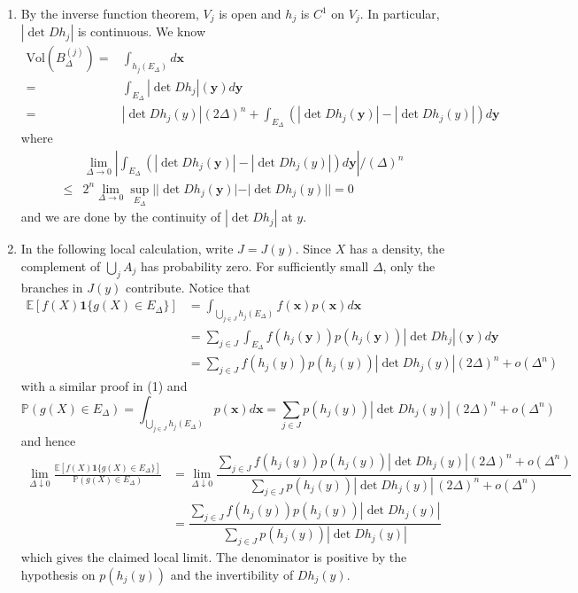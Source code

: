 \documentclass[lang=en,11pt,a4paper,citestyle=authoryear]{elegantpaper}
\newcommand{\E}{\mathbb{E}}
\renewcommand{\P}{\mathbb{P}}
\begin{document}
\begin{enumerate}[label=(\arabic*),leftmargin=*]
\item By the inverse function theorem, $V_j$ is open and $h_j$ is $C^1$ on $V_j$. In particular, $|\det Dh_j|$ is continuous. We know\[\begin{aligned}
\text{Vol}(B_{\Delta}^{(j)}) =& \int_{h_j(E_{\Delta})} d\mathbf{x} \\=& \int_{E_{\Delta}}|\det Dh_j|(\mathbf{y})d\mathbf{y} \\=& |\det Dh_j(y)|(2\Delta)^n + \int_{E_{\Delta}}\left(|\det Dh_j(\mathbf{y})| - |\det Dh_j(y)|\right)d\mathbf{y}
\end{aligned}
\]
where
\[
\begin{aligned}
&\lim\limits_{\Delta\to 0}\left|\int_{E_{\Delta}}\left(|\det Dh_j(\mathbf{y})| - |\det Dh_j(y)|\right)d\mathbf{y}\right|/(\Delta)^n \\ \leq& 2^n\lim_{\Delta \to 0}\sup_{E_{\Delta}}||\det Dh_j(\mathbf{y})| - |\det Dh_j(y)|| = 0
\end{aligned}\]
and we are done by the continuity of $|\det Dh_j|$ at $y$.
\item In the following local calculation, write $J=J(y)$. Since $X$ has a density, the complement of $\bigcup_j A_j$ has probability zero. For sufficiently small $\Delta$, only the branches in $J(y)$ contribute. Notice that
\[
\begin{aligned}
\E[f(X)\mathbf{1}\{g(X)\in E_\Delta\}] &= \int_{\bigcup_{j\in J}h_j(E_{\Delta})} f(\mathbf{x})p(\mathbf{x})d\mathbf{x} \\
&=\sum\limits_{j\in J}\int_{E_{\Delta}} f(h_j(\mathbf{y}))p(h_j(\mathbf{y}))|\det Dh_j|(\mathbf{y})d\mathbf{y} \\
&= \sum\limits_{j\in J} f(h_j(y))p(h_j(y))|\det Dh_j(y)|(2\Delta)^n + o(\Delta^n)
\end{aligned}\]
with a similar proof in (1) and
\[
\P(g(X)\in E_\Delta) = \int_{\bigcup_{j\in J}h_j(E_{\Delta})} p(\mathbf{x})d\mathbf{x} = \sum\limits_{j\in J}p(h_j(y))|\det Dh_j(y)|\,(2\Delta)^n+o(\Delta^n)
\]
and hence
\[
\begin{aligned}
    \lim_{\Delta\downarrow0}\frac{\E[f(X)\mathbf{1}\{g(X)\in E_\Delta\}]}{\P(g(X)\in E_\Delta)} &= \lim_{\Delta\downarrow0}\dfrac{\sum\limits_{j\in J} f(h_j(y))p(h_j(y))|\det Dh_j(y)|(2\Delta)^n + o(\Delta^n)}{\sum\limits_{j\in J}p(h_j(y))|\det Dh_j(y)|\,(2\Delta)^n+o(\Delta^n)} \\
    &= \dfrac{\sum\limits_{j\in J} f(h_j(y))p(h_j(y))|\det Dh_j(y)|}{\sum\limits_{j\in J}p(h_j(y))|\det Dh_j(y)|}
\end{aligned}
\]
which gives the claimed local limit. The denominator is positive by the hypothesis on $p(h_j(y))$ and the invertibility of $Dh_j(y)$.


\end{enumerate}
\end{document}
